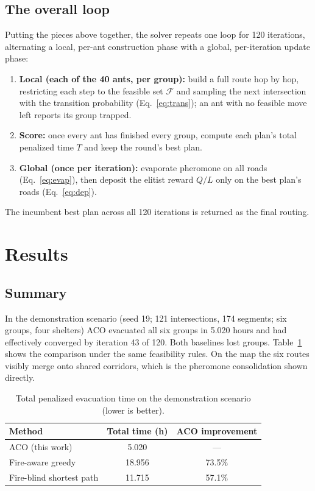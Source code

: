 \documentclass[11pt,a4paper]{article}
\begin{document}
\subsection{The overall loop}
Putting the pieces above together, the solver repeats one loop for 120 iterations, alternating a local, per-ant construction phase with a global, per-iteration update phase:
\begin{enumerate}[leftmargin=*]
\item \textbf{Local (each of the 40 ants, per group):} build a full route hop by hop, restricting each step to the feasible set $\mathcal{F}$ and sampling the next intersection with the transition probability (Eq.~\ref{eq:trans}); an ant with no feasible move left reports its group trapped.
\item \textbf{Score:} once every ant has finished every group, compute each plan's total penalized time $T$ and keep the round's best plan.
\item \textbf{Global (once per iteration):} evaporate pheromone on all roads (Eq.~\ref{eq:evap}), then deposit the elitist reward $Q/L$ only on the best plan's roads (Eq.~\ref{eq:dep}).
\end{enumerate}
The incumbent best plan across all 120 iterations is returned as the final routing.

\section{Results}

\subsection{Summary}
In the demonstration scenario (seed 19; 121 intersections, 174 segments; six groups, four shelters) ACO evacuated all six groups in 5.020 hours and had effectively converged by iteration 43 of 120. Both baselines lost groups. Table~\ref{tab:results} shows the comparison under the same feasibility rules. On the map the six routes visibly merge onto shared corridors, which is the pheromone consolidation shown directly.

\begin{table}[h]
\centering
\caption{Total penalized evacuation time on the demonstration scenario (lower is better).}
\label{tab:results}
\begin{tabular}{lcc}
\toprule
Method & Total time (h) & ACO improvement \\
\midrule
ACO (this work) & 5.020 & --- \\
Fire-aware greedy & 18.956 & 73.5\% \\
Fire-blind shortest path & 11.715 & 57.1\% \\
\bottomrule
\end{tabular}
\end{table}
\end{document}
